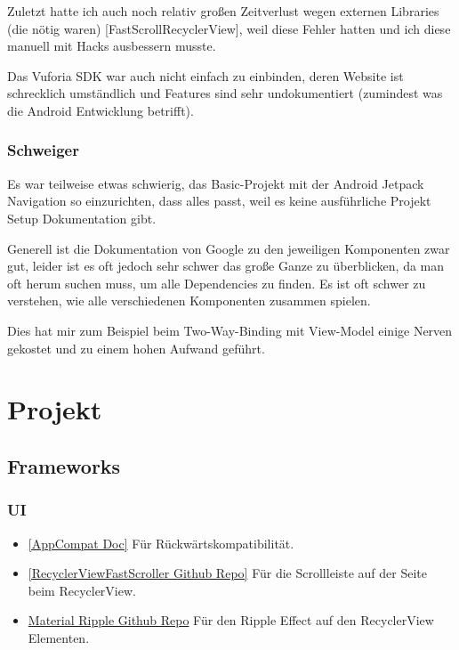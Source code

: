 \documentclass{mrtrash}
\begin{document}
Zuletzt hatte ich auch noch relativ großen Zeitverlust wegen externen Libraries (die nötig waren) [FastScrollRecyclerView], weil diese Fehler hatten und ich diese manuell mit Hacks ausbessern musste.

Das Vuforia SDK war auch nicht einfach zu einbinden, deren Website ist schrecklich umständlich und Features sind sehr undokumentiert (zumindest was die Android Entwicklung betrifft).

\subsection{Schweiger}

Es war teilweise etwas schwierig, das Basic-Projekt mit der Android Jetpack Navigation so einzurichten, dass alles passt, weil es keine ausführliche Projekt Setup Dokumentation gibt.

Generell ist die Dokumentation von Google zu den jeweiligen Komponenten zwar gut, leider ist es oft jedoch sehr schwer das große Ganze zu überblicken, da man oft herum suchen muss, um alle Dependencies zu finden. Es ist oft schwer zu verstehen, wie alle verschiedenen Komponenten zusammen spielen.

Dies hat mir zum Beispiel beim Two-Way-Binding mit View-Model einige Nerven gekostet und zu einem hohen Aufwand geführt.

\chapter{Projekt}

\section{Frameworks}

\subsection{UI}
\begin{itemize}
    \item \href{https://developer.android.com/jetpack/androidx/releases/appcompat}{[AppCompat Doc]} Für Rückwärtskompatibilität.
    \item \href{https://github.com/danoz73/RecyclerViewFastScroller}{[RecyclerViewFastScroller Github Repo]} Für die Scrollleiste auf der Seite beim RecyclerView.
    \item \href{https://github.com/balysv/material-ripple}{Material Ripple Github Repo} Für den Ripple Effect auf den RecyclerView Elementen.
\end{itemize}
\end{document}
